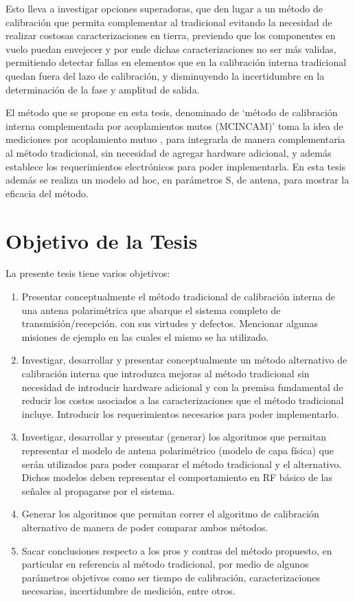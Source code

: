 Esto lleva a investigar opciones superadoras, que den lugar a un método de calibración que permita complementar al tradicional 
evitando la necesidad de realizar costosas caracterizaciones en tierra, previendo que los componentes en vuelo puedan envejecer 
y por ende dichas caracterizaciones no ser más validas, permitiendo detectar fallas en elementos que en la calibración interna 
tradicional quedan fuera del lazo de calibración, y disminuyendo la incertidumbre en la determinación de la fase y amplitud de 
salida.

El método que se propone en esta tesis, denominado de \enquote*{método de calibración interna complementada por acoplamientos 
mutos (MCINCAM)} toma la idea de mediciones por acoplamiento mutuo \cite{Agrawal2003}\cite{Shipley2000} \cite{Aumann1989}
\cite{Chen2012}, para integrarla de manera complementaria al método tradicional, sin necesidad de agregar hardware 
adicional, y además establece los requerimientos electrónicos para poder implementarla. En esta tesis además se realiza un modelo 
ad hoc, en parámetros S, de antena, para mostrar la eficacia del método. 


\section{Objetivo de la Tesis}

La presente tesis tiene varios objetivos:

\begin{enumerate}
    \item Presentar conceptualmente el método tradicional de calibración interna de una antena polarimétrica que abarque el 
			sistema completo de transmisión/recepción. con sus virtudes y defectos. Mencionar algunas misiones de ejemplo en
			las cuales el mismo se ha utilizado.
    \item Investigar, desarrollar y presentar conceptualmente un método alternativo de calibración interna que introduzca 
			mejoras al método tradicional sin necesidad de introducir hardware adicional y con la premisa fundamental de 
			reducir los costos asociados a las caracterizaciones que el método tradicional incluye. Introducir los 
			requerimientos necesarios para poder implementarlo.
    \item Investigar, desarrollar y presentar (generar) los algoritmos que permitan representar el modelo de antena 
			polarimétrico (modelo de capa física) que serán utilizados para poder comparar el método tradicional y el 
			alternativo. Dichos modelos deben representar el comportamiento en RF básico de las señales al propagarse por el 
			sistema.
    \item Generar los algoritmos que permitan correr el algoritmo de calibración alternativo de manera de poder comparar ambos 
			métodos.
    \item Sacar conclusiones respecto a los pros y contras del método propuesto, en particular en referencia al método 
			tradicional, por medio de algunos parámetros objetivos como ser tiempo de calibración, caracterizaciones necesarias, 
			incertidumbre de medición, entre otros.
\end{enumerate}    


